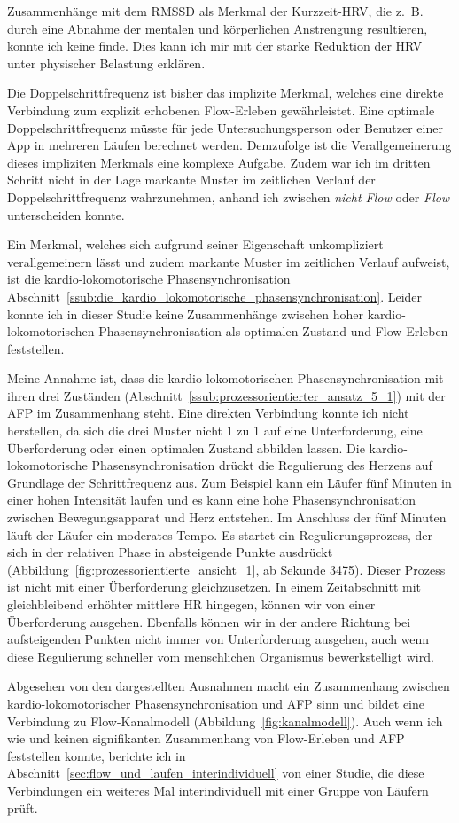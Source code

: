 Zusammenhänge mit dem \acs{RMSSD} als Merkmal der Kurzzeit-\ac{HRV}, die z.~B. durch eine Abnahme der mentalen und körperlichen Anstrengung resultieren, konnte ich keine finde. Dies kann ich mir mit der starke Reduktion der \ac{HRV} unter physischer Belastung erklären.

Die Doppelschrittfrequenz ist bisher das implizite Merkmal, welches eine direkte Verbindung zum explizit erhobenen Flow-Erleben gewährleistet. Eine optimale Doppelschrittfrequenz müsste für jede Untersuchungsperson oder Benutzer einer App in mehreren Läufen berechnet werden. Demzufolge ist die Verallgemeinerung dieses impliziten Merkmals eine komplexe Aufgabe. Zudem war ich im dritten Schritt nicht in der Lage markante Muster im zeitlichen Verlauf der Doppelschrittfrequenz wahrzunehmen, anhand ich zwischen \emph{nicht Flow} oder \emph{Flow} unterscheiden konnte.

Ein Merkmal, welches sich aufgrund seiner Eigenschaft unkompliziert verallgemeinern lässt und zudem markante Muster im zeitlichen Verlauf aufweist, ist die kardio-lokomotorische Phasensynchronisation Abschnitt~\ref{ssub:die_kardio_lokomotorische_phasensynchronisation}. Leider konnte ich in dieser Studie keine Zusammenhänge zwischen hoher kardio-lokomotorischen Phasensynchronisation als optimalen Zustand und Flow-Erleben feststellen. 

Meine Annahme ist, dass die kardio-lokomotorischen Phasensynchronisation mit ihren drei Zuständen (Abschnitt~\ref{ssub:prozessorientierter_ansatz_5_1}) mit der \ac{AFP} im Zusammenhang steht. Eine direkten Verbindung konnte ich nicht herstellen, da sich die drei Muster nicht 1 zu 1 auf eine Unterforderung, eine Überforderung oder einen optimalen Zustand abbilden lassen. Die kardio-lokomotorische Phasensynchronisation drückt die Regulierung des Herzens auf Grundlage der Schrittfrequenz aus. Zum Beispiel kann ein Läufer fünf Minuten in einer hohen Intensität laufen und es kann eine hohe Phasensynchronisation zwischen Bewegungsapparat und Herz entstehen. Im Anschluss der fünf Minuten läuft der Läufer ein moderates Tempo. Es startet ein Regulierungsprozess, der sich in der relativen Phase in absteigende Punkte ausdrückt (Abbildung~\ref{fig:prozessorientierte_ansicht_1}, ab Sekunde 3475). Dieser Prozess ist nicht mit einer Überforderung gleichzusetzen. In einem Zeitabschnitt mit gleichbleibend erhöhter mittlere \ac{HR} hingegen, können wir von einer Überforderung ausgehen. Ebenfalls können wir in der andere Richtung bei aufsteigenden Punkten nicht immer von Unterforderung ausgehen, auch wenn diese Regulierung schneller vom menschlichen Organismus bewerkstelligt wird.

Abgesehen von den dargestellten Ausnahmen macht ein Zusammenhang zwischen kardio-lokomotorischer Phasensynchronisation und \ac{AFP} sinn und bildet eine Verbindung zu Flow-Kanalmodell (Abbildung~\ref{fig:kanalmodell}). Auch wenn ich wie \citet{Stoll2005} und \citet{Reinhardt2006} keinen signifikanten Zusammenhang von Flow-Erleben und \ac{AFP} feststellen konnte, berichte ich in Abschnitt~\ref{sec:flow_und_laufen_interindividuell} von einer Studie, die diese Verbindungen ein weiteres Mal interindividuell mit einer Gruppe von Läufern prüft.

